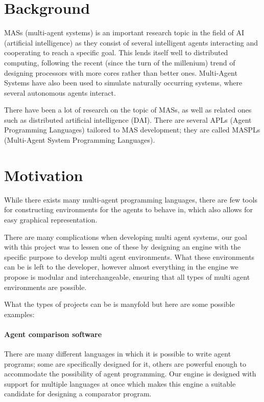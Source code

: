 
\section*{Background}

MASs (multi-agent systems) is an important research topic in the field
of AI (artificial intelligence) as they consist of several intelligent
agents interacting and cooperating to reach a specific goal. This
lends itself well to distributed computing, following the recent (since
the turn of the millenium) trend of designing processors with more
cores rather than better ones. Multi-Agent Systems have also been
used to simulate naturally occurring systems, where several autonomous
agents interact. 

There have been a lot of research on the topic of MASs, as well as
related ones such as distributed artificial intelligence (DAI). There
are several APLs (Agent Programming Languages) tailored to MAS development;
they are called MASPLs (Multi-Agent System Programming Languages). 


\section*{Motivation}

While there exists many multi-agent programming languages, there are
few tools for constructing environments for the agents to behave in,
which also allows for easy graphical representation. 

There are many complications when developing multi agent systems,
our goal with this project was to lessen one of these by designing
an engine with the specific purpose to develop multi agent environments.
What these environments can be is left to the developer, however almost
everything in the engine we propose is modular and interchangeable,
ensuring that all types of multi agent environments are possible. 

What the types of projects can be is manyfold but here are some possible
examples:


\paragraph*{Agent comparison software}

There are many different languages in which it is possible to write
agent programs; some are specifically designed for it, others are
powerful enough to accommodate the possibility of agent programming.
Our engine is designed with support for multiple languages at once
which makes this engine a suitable candidate for designing a comparator
program. 

